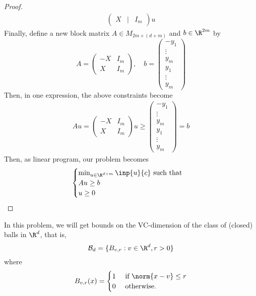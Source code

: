 \documentclass[12pt]{article}
\begin{document}
\begin{proof}
\begin{align*}
\begin{pmatrix}
      X & \vert& I_{m}
      \end{pmatrix}u
  \end{align*}
  Finally, define a new block matrix $ A\in M_{2m \times (d+m)} $ and $ b\in \R^{2m} $ by 
  \[
    A = \begin{pmatrix} -X & I_{m} \\ X & I_{m}
      \end{pmatrix}, \quad b=\begin{pmatrix}-y_{1} \\ \vdots \\ y_{m} \\ y_{1} \\ \vdots \\ y_{m}\end{pmatrix}
  \]
  Then, in one expression, the above constraints become
  \begin{align*}
    Au = \begin{pmatrix} -X & I_{m} \\ X & I_{m}
    \end{pmatrix}u\geq \begin{pmatrix}-y_{1} \\ \vdots \\ y_{m} \\ y_{1} \\ \vdots \\ y_{m}\end{pmatrix} = b
  \end{align*}
  Then, as linear program, our problem becomes
 \[
    \begin{cases}
      \min_{u\in\R^{d+m}} \inp{u}{c}\text{ such that}\\
      Au \geq b\\
      u\geq 0
    \end{cases}
  \]

\end{proof}

\begin{homeworkProblem}
  In this problem, we will get bounds on the VC-dimension of the class of (closed) balls in $ \R^{d} $, that is,
  \[
    \mathcal{B}_{d} = \{B_{v,r}:v\in \R^{d}, r>0\}
  \]
  where 
  \[
    B_{v,r}(x) = \begin{cases}
      1 & \text{ if }\norm{x-v}\leq r\\
      0 & \text{ otherwise}.
    \end{cases}
  \]
\end{homeworkProblem}
\end{document}
